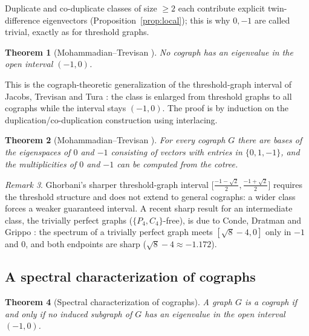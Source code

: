 \documentclass[11pt]{article}
\theoremstyle{plain}
\newtheorem{theorem}{Theorem}[section]
\theoremstyle{definition}
\theoremstyle{remark}
\newtheorem{remark}[theorem]{Remark}
\begin{document}
	Duplicate and co-duplicate classes of size $\ge2$ each contribute explicit twin-difference eigenvectors (Proposition~\ref{prop:local}); this is why $0,-1$ are called trivial, exactly as for threshold graphs.
	
	\begin{theorem}[Mohammadian--Trevisan \cite{MohammadianTrevisan2016}]
		\label{thm:mt-main}
		No cograph has an eigenvalue in the open interval $(-1,0)$.
	\end{theorem}
	
	This is the cograph-theoretic generalization of the threshold-graph interval of Jacobs, Trevisan and Tura \cite{JacobsTrevisanTura2013}: the class is enlarged from threshold graphs to all cographs while the interval stays $(-1,0)$. The proof is by induction on the duplication/co-duplication construction using interlacing.
	
	\begin{theorem}[Mohammadian--Trevisan \cite{MohammadianTrevisan2016}]
		\label{thm:mt-eigenspace}
		For every cograph $G$ there are bases of the eigenspaces of $0$ and $-1$ consisting of vectors with entries in $\{0,1,-1\}$, and the multiplicities of $0$ and $-1$ can be computed from the cotree.
	\end{theorem}
	
	\begin{remark}
		\label{rem:noshrink}
		Ghorbani's sharper threshold-graph interval $\bigl[\frac{-1-\sqrt2}{2},\frac{-1+\sqrt2}{2}\bigr]$ \cite{Ghorbani2019threshold} requires the threshold structure and does not extend to general cographs: a wider class forces a weaker guaranteed interval. A recent sharp result for an intermediate class, the trivially perfect graphs ($\{P_4,C_4\}$-free), is due to Conde, Dratman and Grippo \cite{CondeDratmanGrippo2026}: the spectrum of a trivially perfect graph meets $[\sqrt8-4,0]$ only in $-1$ and $0$, and both endpoints are sharp ($\sqrt8-4\approx-1.172$).
	\end{remark}
	
	\subsection{A spectral characterization of cographs}
	
	\begin{theorem}[Spectral characterization of cographs]
		\label{thm:spectralchar}
		A graph $G$ is a cograph if and only if no induced subgraph of $G$ has an eigenvalue in the open interval $(-1,0)$.
	\end{theorem}
	
\end{document}
